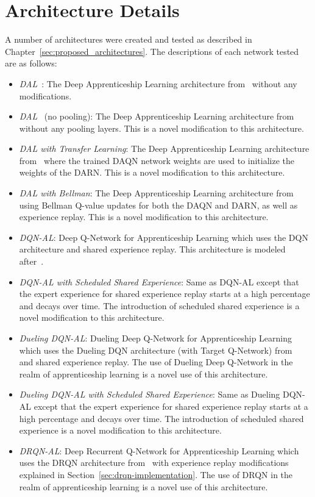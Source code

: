 \documentclass[12pt,american]{report}
\begin{document}
\section{Architecture Details}
\label{sec:arch_details}
A number of architectures were created and tested as described in Chapter~\ref{sec:proposed_architectures}. The descriptions of each network tested are as follows:
\begin{itemize}
	\item \textit{DAL}~\cite{markovikj2014deep}: The Deep Apprenticeship Learning architecture from~\cite{markovikj2014deep} without any modifications.
	\item \textit{DAL}~\cite{markovikj2014deep} (no pooling): The Deep Apprenticeship Learning architecture from~\cite{markovikj2014deep} without any pooling layers. This is a novel modification to this architecture.
    \item \textit{DAL with Transfer Learning}: The Deep Apprenticeship Learning architecture from~\cite{markovikj2014deep} where the trained DAQN network weights are used to initialize the weights of the DARN. This is a novel modification to this architecture.
    \item \textit{DAL with Bellman}: The Deep Apprenticeship Learning architecture from~\cite{markovikj2014deep} using Bellman Q-value updates for both the DAQN and DARN, as well as experience replay. This is a novel modification to this architecture.
    \item \textit{DQN-AL}: Deep Q-Network for Apprenticeship Learning which uses the DQN architecture and shared experience replay. This architecture is modeled after~\cite{hester2017learning}.
    \item \textit{DQN-AL with Scheduled Shared Experience}: Same as DQN-AL except that the expert experience for shared experience replay starts at a high percentage and decays over time. The introduction of scheduled shared experience is a novel modification to this architecture.
	\item \textit{Dueling DQN-AL}: Dueling Deep Q-Network for Apprenticeship Learning which uses the Dueling DQN architecture (with Target Q-Network) from~\cite{wang2015dueling} and shared experience replay.  The use of Dueling Deep Q-Network in the realm of apprenticeship learning is a novel use of this architecture.
    \item \textit{Dueling DQN-AL with Scheduled Shared Experience}: Same as Dueling DQN-AL except that the expert experience for shared experience replay starts at a high percentage and decays over time. The introduction of scheduled shared experience is a novel modification to this architecture. 
 \item \textit{DRQN-AL}: Deep Recurrent Q-Network for Apprenticeship Learning which uses the DRQN architecture from~\cite{HausknechtDRQN} with experience replay modifications explained in Section~\ref{sec:drqn-implementation}. The use of DRQN in the realm of apprenticeship learning is a novel use of this architecture.
\end{itemize}
\end{document}
